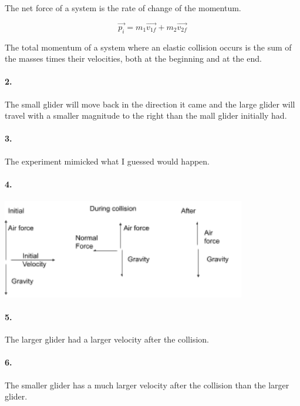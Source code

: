     The net force of a system is the rate of change of the momentum.

    \begin{equation}
        \vec{p_{i}} = m_{1}\vec{v_{1f}} + m_{2}\vec{v_{2f}}
    \end{equation}

    The total momentum of a system where an elastic collision occurs is the sum of the masses times their velocities, both at the beginning and at the end.

    \paragraph*{2.}
    The small glider will move back in the direction it came and the large glider will travel with a smaller magnitude to the right than the mall glider initially had.

    \paragraph*{3.}
    The experiment mimicked what I guessed would happen.

    \paragraph*{4.}\mbox{}

    \includegraphics[width=0.8\textwidth]{image5.png}

    \paragraph*{5.}

    The larger glider had a larger velocity after the collision.

    \paragraph*{6.}

    The smaller glider has a much larger velocity after the collision than the larger glider.

